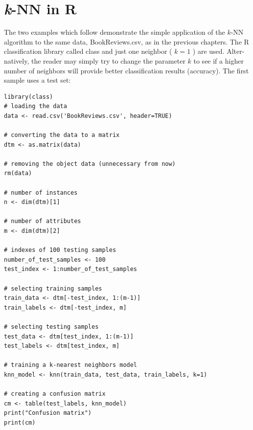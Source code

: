 \section{\textit{k}-NN in R}
The two examples which follow demonstrate the simple application of the $k$-NN algorithm to the same data, BookReviews.csv, as in the previous chapters. The R classification library called class and just one neighbor ( $k=1$ ) are used. Alter-\\
natively, the reader may simply try to change the parameter $k$ to see if a higher number of neighbors will provide better classification results (accuracy). The first sample uses a test set:

\begin{verbatim}
library(class)
# loading the data
data <- read.csv('BookReviews.csv', header=TRUE)

# converting the data to a matrix
dtm <- as.matrix(data)

# removing the object data (unnecessary from now)
rm(data)

# number of instances
n <- dim(dtm)[1]

# number of attributes
m <- dim(dtm)[2]

# indexes of 100 testing samples
number_of_test_samples <- 100
test_index <- 1:number_of_test_samples

# selecting training samples
train_data <- dtm[-test_index, 1:(m-1)]
train_labels <- dtm[-test_index, m]

# selecting testing samples
test_data <- dtm[test_index, 1:(m-1)]
test_labels <- dtm[test_index, m]

# training a k-nearest neighbors model
knn_model <- knn(train_data, test_data, train_labels, k=1)

# creating a confusion matrix
cm <- table(test_labels, knn_model)
print("Confusion matrix")
print(cm)
\end{verbatim}

